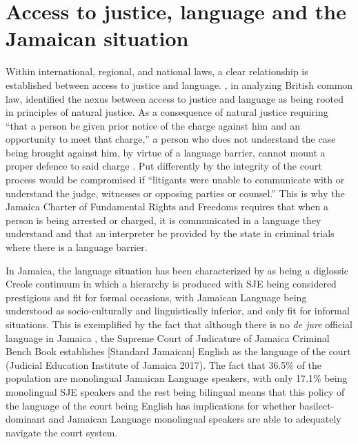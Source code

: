 \documentclass[output=paper,colorlinks,citecolor=brown]{langscibook}
\begin{document}
\section{Access to justice, language and the Jamaican situation}

Within international, regional, and national laws, a clear relationship is established between access to justice and language. \citet{Brown-Blake2006}, in analyzing British common law, identified the nexus between access to justice and language as being rooted in principles of natural justice. As a consequence of natural justice requiring “that a person be given prior notice of the charge against him and an opportunity to meet that charge,” a person who does not understand the case being brought against him, by virtue of a language barrier, cannot mount a proper defence to said charge \citep[393]{Brown-Blake2006}. Put differently by \citet[98]{Ng2009} the integrity of the court process would be compromised if “litigants were unable to communicate with or understand the judge, witnesses or opposing parties or counsel.” This is why the Jamaica Charter of Fundamental Rights and Freedoms requires that when a person is being arrested or charged, it is communicated in a language they understand and that an interpreter be provided by the state in criminal trials where there is a language barrier.

In Jamaica, the language situation has been characterized by \citet{Winford1985} as being a diglossic Creole continuum in which a hierarchy is produced with SJE being considered prestigious and fit for formal occasions, with Jamaican Language being understood as socio-culturally and linguistically inferior, and only fit for informal situations. This is exemplified by the fact that although there is no \textit{de jure} official language in Jamaica \citep{BrownBlake2017}, the Supreme Court of Judicature of Jamaica Criminal Bench Book establishes [Standard Jamaican] English as the language of the court (Judicial Education Institute of Jamaica 2017). The fact that 36.5\% of the population are monolingual Jamaican Language speakers, with only 17.1\% being monolingual SJE speakers and the rest being bilingual \citep{JamaicanLanguageUnit2007} means that this policy of the language of the court being English has implications for whether basilect-dominant and Jamaican Language monolingual speakers are able to adequately navigate the court system. 
\end{document}
